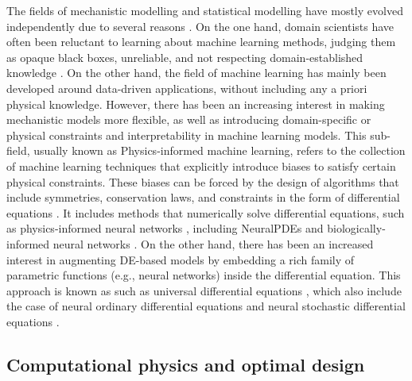 The fields of mechanistic modelling and statistical modelling have mostly evolved independently due to several reasons \cite{zdeborova_understanding_2020}. 
On the one hand, domain scientists have often been reluctant to learning about machine learning methods, judging them as opaque black boxes, unreliable, and not respecting domain-established knowledge \cite{Coveney:2016eb}. 
On the other hand, the field of machine learning has mainly been developed around data-driven applications, without including any a priori physical knowledge. 
However, there has been an increasing interest in making mechanistic models more flexible, as well as introducing domain-specific or physical constraints and interpretability in machine learning models. 
This sub-field, usually known as Physics-informed machine learning, refers to the collection of machine learning techniques that explicitly introduce biases to satisfy certain physical constraints. 
These biases can be forced by the design of algorithms that include symmetries, conservation laws, and constraints in the form of differential equations \cite{Karniadakis_Kevrekidis_Lu_Perdikaris_Wang_Yang_2021}. 
It includes methods that numerically solve differential equations, such as physics-informed neural networks \cite{PINNs_2019}, including NeuralPDEs \cite{Zubov_McCarthy_Ma_Calisto_Pagliarino_Azeglio_Bottero_Luján_Sulzer_Bharambe_et} and biologically-informed neural networks \cite{Lagergren_Nardini_Baker_Simpson_Flores_2020}. 
On the other hand, there has been an increased interest in augmenting DE-based models by embedding a rich family of parametric functions (e.g., neural networks) inside the differential equation.  
This approach is known as such as universal differential equations \cite{rackauckas2020universal, Dandekar_2020}, which also include the case of neural ordinary differential equations \cite{chen_neural_2019} and neural stochastic differential equations \cite{li2020scalable}.



\subsection{Computational physics and optimal design}

